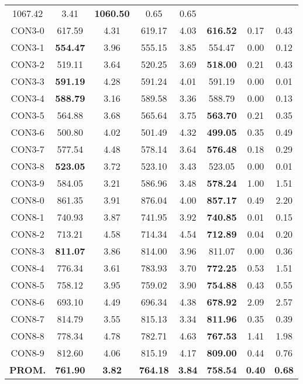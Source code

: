 \begin{table}[h]
\begin{tabular}{c c c c c c c c}
1067.42 & 3.41 & \bf{1060.50} & 
0.65 & 0.65\\CON3-0 & 617.59 & 4.31 & 
619.17 & 4.03 & \bf{616.52} & 
0.17 & 0.43\\CON3-1 & \bf{554.47} & 3.96 & 
555.15 & 3.85 & 554.47 & 0.00
 & 0.12\\CON3-2 & 519.11 & 3.64 & 
520.25 & 3.69 & \bf{518.00} & 
0.21 & 0.43\\CON3-3 & \bf{591.19} & 4.28 & 
591.24 & 4.01 & 591.19 & 0.00
 & 0.01\\CON3-4 & \bf{588.79} & 3.16 & 
589.58 & 3.36 & 588.79 & 0.00
 & 0.13\\CON3-5 & 564.88 & 3.68 & 
565.64 & 3.75 & \bf{563.70} & 
0.21 & 0.35\\CON3-6 & 500.80 & 4.02 & 
501.49 & 4.32 & \bf{499.05} & 
0.35 & 0.49\\CON3-7 & 577.54 & 4.48 & 
578.14 & 3.64 & \bf{576.48} & 
0.18 & 0.29\\CON3-8 & \bf{523.05} & 3.72 & 
523.10 & 3.43 & 523.05 & 0.00
 & 0.01\\CON3-9 & 584.05 & 3.21 & 
586.96 & 3.48 & \bf{578.24} & 
1.00 & 1.51\\CON8-0 & 861.35 & 3.91 & 
876.04 & 4.00 & \bf{857.17} & 
0.49 & 2.20\\CON8-1 & 740.93 & 3.87 & 
741.95 & 3.92 & \bf{740.85} & 
0.01 & 0.15\\CON8-2 & 713.21 & 4.58 & 
714.34 & 4.54 & \bf{712.89} & 
0.04 & 0.20\\CON8-3 & \bf{811.07} & 3.86 & 
814.00 & 3.96 & 811.07 & 0.00
 & 0.36\\CON8-4 & 776.34 & 3.61 & 
783.93 & 3.70 & \bf{772.25} & 
0.53 & 1.51\\CON8-5 & 758.12 & 3.95 & 
759.02 & 3.90 & \bf{754.88} & 
0.43 & 0.55\\CON8-6 & 693.10 & 4.49 & 
696.34 & 4.38 & \bf{678.92} & 
2.09 & 2.57\\CON8-7 & 814.79 & 3.55 & 
815.13 & 3.34 & \bf{811.96} & 
0.35 & 0.39\\CON8-8 & 778.34 & 4.78 & 
782.71 & 4.63 & \bf{767.53} & 
1.41 & 1.98\\CON8-9 & 812.60 & 4.06 & 
815.19 & 4.17 & \bf{809.00} & 
0.44 & 0.76\\\bf{PROM.} & 
\bf{761.90} & \bf{3.82} & \bf{764.18} & \bf{3.84} & \bf{758.54} & \bf{0.40} & \bf{0.68}\\[1ex]\hline
\end{tabular}
\label{table:nonlin}
\end{table}
